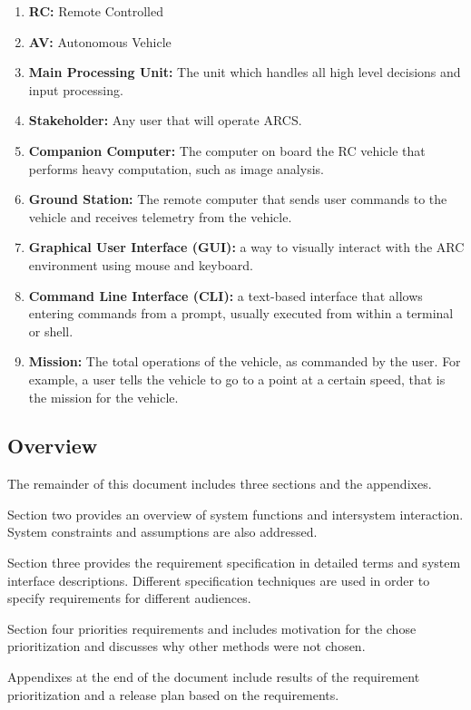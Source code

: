 \documentclass[compsoc,draftclsnofoot,onecolumn,10pt]{IEEEtran}
\begin{document}
\begin{enumerate}
	\item \textbf{RC:} Remote Controlled
	\item \textbf{AV:} Autonomous Vehicle
	\item \textbf{Main Processing Unit:} The unit which handles all high level decisions and input processing. 
	\item \textbf{Stakeholder:} Any user that will operate ARCS.
	\item \textbf{Companion Computer:} The computer on board the RC vehicle that performs heavy computation, such as image analysis.
	\item \textbf{Ground Station:} The remote computer that sends user commands to the vehicle and receives telemetry from the vehicle.
	\item \textbf{Graphical User Interface (GUI):} a way to visually interact with the ARC environment using mouse and keyboard.
	\item \textbf{Command Line Interface (CLI):} a text-based interface that allows entering commands from a prompt, usually executed from within a terminal or shell.
	\item \textbf{Mission:} The total operations of the vehicle, as commanded by the user. For example, a user tells the vehicle to go to a point at a certain speed, that is the mission for the vehicle.
\end{enumerate}





\subsection{Overview} %
The remainder of this document includes three sections and the appendixes. \par
Section two provides an overview of system functions and intersystem interaction. 
System constraints and assumptions are also addressed. \par
Section three provides the requirement specification in detailed terms and system interface descriptions. Different specification techniques are used in order to specify requirements for different audiences. \par
Section four priorities requirements and includes motivation for the chose prioritization and discusses why other methods were not chosen. \par
Appendixes at the end of the document include results of the requirement prioritization and a release plan based on the requirements. \cite{IEEE830}
\end{document}
